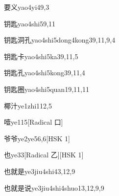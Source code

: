 \begin{entry}{要义}{yao4yi4}{9,3}
\end{entry}

\begin{entry}{钥匙}{yao4shi5}{9,11}
\end{entry}

\begin{entry}{钥匙洞孔}{yao4shi5dong4kong3}{9,11,9,4}
\end{entry}

\begin{entry}{钥匙卡}{yao4shi5ka3}{9,11,5}
\end{entry}

\begin{entry}{钥匙孔}{yao4shi5kong3}{9,11,4}
\end{entry}

\begin{entry}{钥匙圈}{yao4shi5quan1}{9,11,11}
\end{entry}

\begin{entry}{椰汁}{ye1zhi1}{12,5}
\end{entry}

\begin{entry}{噎}{ye1}{15}[Radical 口]
\end{entry}

\begin{entry}{爷爷}{ye2ye5}{6,6}[HSK 1]
\end{entry}

\begin{entry}{也}{ye3}{3}[Radical 乙][HSK 1]
\end{entry}

\begin{entry}{也就是}{ye3jiu4shi4}{3,12,9}
\end{entry}

\begin{entry}{也就是说}{ye3jiu4shi4shuo1}{3,12,9,9}
\end{entry}


